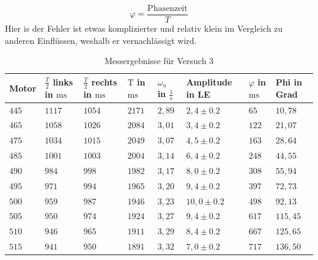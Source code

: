             \begin{equation}
                \varphi = \frac{\text{Phasenzeit}}{T}
            \end{equation}
            Hier is der Fehler ist etwas komplizierter und relativ klein im Vergleich zu anderen Einflüssen, weshalb er vernachlässigt wird.
            \begin{table}[H]
                \centering
                \caption{Messergebnisse für Versuch 3}
                \vspace{0.5em}
                \begin{tabular}{|l|l|l|l|l|l|l|l|}
                    \hline
                    Motor & $\frac{T}{2}$ links in $\mathrm{ms}$ & $\frac{T}{2}$ rechts in $\mathrm{ms}$ & $\mathrm{T}$ in $\mathrm{ms}$ & $\omega_{a}$ in $\frac{1}{\mathrm{s}}$ & Amplitude in LE& $\varphi$ in $\mathrm{ms}$ & Phi in Grad\\
                    \hline
                    \hline
                    $445$ & $1117 $ & $1054 $ & $2171 $ & $2,89$ & $2,4 \pm 0.2$ & $65 $ & $10,78$\\
                    \hline
                    $465$ & $1058 $ & $1026 $ & $2084 $ & $3,01$ & $3,4 \pm 0.2$ & $122$ & $21,07$\\
                    \hline
                    $475$ & $1034 $ & $1015 $ & $2049 $ & $3,07$ & $4,5 \pm 0.2$ & $163 $ & $28,64$\\
                    \hline
                    $485$ & $1001 $ & $1003 $ & $2004 $ & $3,14$ & $6,4 \pm 0.2$ & $248 $ & $44,55$\\
                    \hline
                    $490$ & $984 $ & $998 $ & $1982 $ & $3,17$ & $8,0 \pm 0.2$ & $308 $ & $55,94$\\
                    \hline
                    $495$ & $971 $ & $994 $ & $1965 $ & $3,20$ & $9,4 \pm 0.2$ & $397 $ & $72,73$\\
                    \hline
                    $500$ & $959 $ & $987 $ & $1946 $ & $3,23$ & $10,0 \pm 0.2$ & $498 $ & $92,13$\\
                    \hline
                    $505$ & $950 $ & $974 $ & $1924 $ & $3,27$ & $9,4 \pm 0.2$ & $617 $ & $115,45$\\
                    \hline
                    $510$ & $946 $ & $965 $ & $1911 $ & $3,29$ & $8,4 \pm 0.2$ & $667 $ & $125,65$\\
                    \hline
                    $515$ & $941 $ & $950 $ & $1891$ & $3,32$ & $7,0 \pm 0.2$ & $717 $ & $136,50$\\

\end{tabular}
\end{table}
